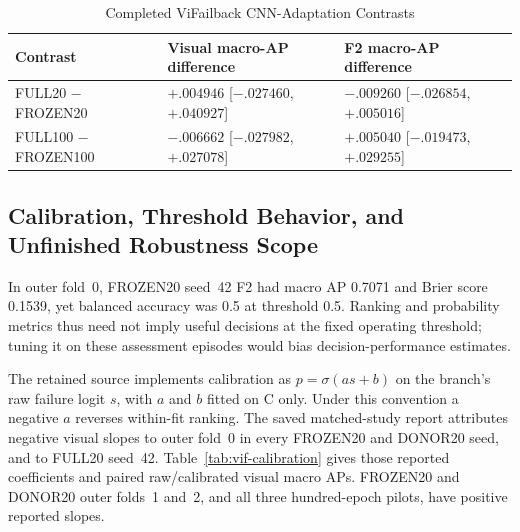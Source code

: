 \begin{table}[htbp]
\caption{Completed ViFailback CNN-Adaptation Contrasts}\label{tab:vif-adaptation}
\centering\small
\begin{tabularx}{\linewidth}{@{}lYY@{}}\toprule
Contrast & Visual macro-AP difference & F2 macro-AP difference\\\midrule
FULL20 $-$ FROZEN20 & $+.004946$ [$-.027460$, $+.040927$] & $-.009260$ [$-.026854$, $+.005016$]\\
FULL100 $-$ FROZEN100 & $-.006662$ [$-.027982$, $+.027078$] & $+.005040$ [$-.019473$,
$+.029255$]\\\bottomrule
\end{tabularx}
\end{table}

\subsection{Calibration, Threshold Behavior, and Unfinished Robustness Scope}
In outer fold~0, FROZEN20 seed~42 F2 had macro AP 0.7071 and Brier score 0.1539,
yet balanced accuracy was 0.5 at threshold 0.5. Ranking and probability metrics thus
need not imply useful decisions at the fixed operating threshold; tuning it on these
assessment episodes would bias decision-performance estimates.

The retained source implements calibration as $p=\sigma(a s+b)$ on the branch's raw
failure logit $s$, with $a$ and $b$ fitted on C only. Under this convention a negative
$a$ reverses within-fit ranking. The saved matched-study report attributes negative
visual slopes to outer fold~0 in every FROZEN20 and DONOR20 seed, and to FULL20
seed~42. Table~\ref{tab:vif-calibration} gives those reported coefficients and paired
raw/calibrated visual macro APs. FROZEN20 and DONOR20 outer folds~1 and~2, and all
three hundred-epoch pilots, have positive reported slopes.


